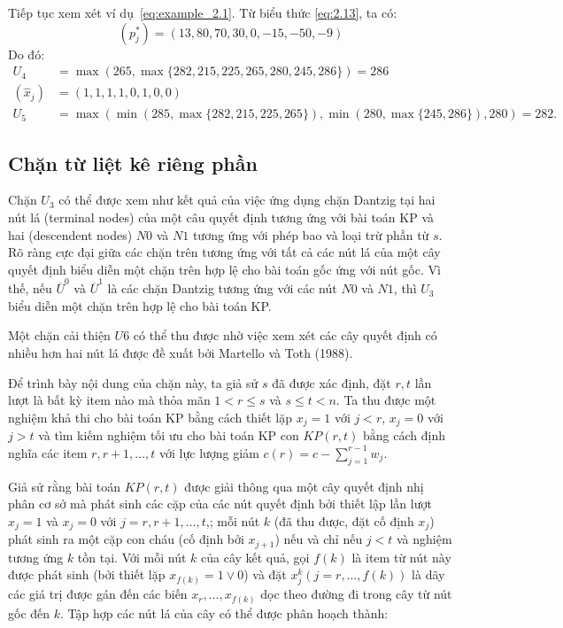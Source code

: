 \begin{example}
    Tiếp tục xem xét ví dụ~\ref{eq:example_2.1}. Từ biểu thức \eqref{eq:2.13}, ta có:
    \begin{equation*}
        (p_j^*) = (13, 80, 70, 30, 0, -15, -50, -9)
    \end{equation*}
    Do đó:
    \begin{align*}
        U_4 &= \max(265, \max\{282, 215, 225, 265, 280, 245, 286\}) = 286\\
        (\hat{x}_j) &= (1, 1, 1, 1, 0, 1, 0, 0)\\
        U_5 &= \max(\min(285, \max\{282, 215, 225, 265\}), \min(280, \max\{245, 286\}), 280) = 282.
    \end{align*}
\end{example}

\subsection{Chặn từ liệt kê riêng phần}

Chặn $U_3$ có thể được xem như kết quả của việc ứng dụng chặn Dantzig tại hai nút lá (terminal nodes) của một câu quyết định tương ứng với bài toán KP và hai  (descendent nodes) $N0$ và $N1$ tương ứng với phép bao và loại trừ phần từ $s$. Rõ ràng cực đại giữa các chặn trên tương ứng với tất cả các nút lá của một cây quyết định biểu diễn một chặn trên hợp lệ cho bài toán gốc ứng với nút gốc. Vì thế, nếu $\overline{U}^0$ và $\overline{U}^1$ là các chặn Dantzig tương ứng với các nút $N0$ và $N1$, thì $U_3$ biểu diễn một chặn trên hợp lệ cho bài toán KP.

Một chặn cải thiện $U6$ có thể thu được nhờ việc xem xét các cây quyết định có nhiều hơn hai nút lá được đề xuất bởi Martello và Toth (1988).

Để trình bày nội dung của chặn này, ta giả sử $s$ đã được xác định, đặt $r, t$ lần lượt là bất kỳ item nào mà thỏa mãn $1 < r \leq s$ và $s \leq t < n$. Ta thu được một nghiệm khả thi cho bài toán KP bằng cách thiết lặp $x_j = 1$ với $j < r$, $x_j = 0$ với $j > t$ và tìm kiếm nghiệm tối ưu cho bài toán KP con $KP(r, t)$ bằng cách định nghĩa các item $r, r + 1, \dots, t$ với lực lượng giảm $c(r) = c - \sum_{j = 1}^{r - 1}w_j$. 

Giả sử rằng bài toán $KP(r, t)$ được giải thông qua một cây quyết định nhị phân cơ sở mà phát sinh các cặp của các nút quyết định bởi thiết lập lần lượt $x_j = 1$ và $x_j = 0$ với $j =r, r+1, \dots, t$,; mỗi nút $k$ (đã thu được, đặt cố định $x_j$) phát sinh ra một cặp con cháu (cố định bởi $x_{j+1}$) nếu và chỉ nếu $j < t$ và nghiệm tương ứng $k$ tồn tại. Với mỗi nút $k$ của cây kết quả, gọi $f(k)$ là item từ nút này được phát sinh (bởi thiết lặp $x_{f(k)} = 1 \vee 0$) và đặt $x_j^k (j = r, \dots, f(k))$ là dãy các giá trị được gán đến các biến $x_r, \dots, x_{f(k)}$ dọc theo đường đi trong cây từ nút gốc đến $k$. Tập hợp các nút lá của cây có thể được phân hoạch thành:

